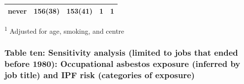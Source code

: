 \documentclass[
]{article}
\begin{document}
\begin{longtable}[]{@{}lllll@{}}
\begin{minipage}[t]{0.06\columnwidth}
never\strut
\end{minipage} & \begin{minipage}[t]{0.10\columnwidth}\raggedright
156(38)\strut
\end{minipage} & \begin{minipage}[t]{0.12\columnwidth}\raggedright
153(41)\strut
\end{minipage} & \begin{minipage}[t]{0.29\columnwidth}\raggedright
1\strut
\end{minipage} & \begin{minipage}[t]{0.28\columnwidth}\raggedright
1\strut
\end{minipage}\tabularnewline
\bottomrule
\end{longtable}

\textsuperscript{1} Adjusted for age, smoking, and centre

\hypertarget{table-ten-sensitivity-analysis-limited-to-jobs-that-ended-before-1980-occupational-asbestos-exposure-inferred-by-job-title-and-ipf-risk-categories-of-exposure}{%
\subsubsection{Table ten: Sensitivity analysis (limited to jobs that
ended before 1980): Occupational asbestos exposure (inferred by job
title) and IPF risk (categories of
exposure)}\label{table-ten-sensitivity-analysis-limited-to-jobs-that-ended-before-1980-occupational-asbestos-exposure-inferred-by-job-title-and-ipf-risk-categories-of-exposure}}
\end{document}
